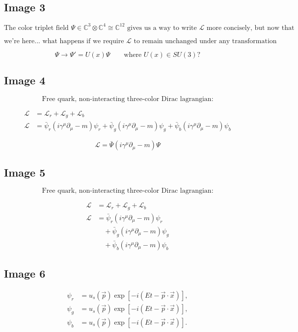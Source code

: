 \documentclass[11pt]{article}
\begin{document}
\subsection*{Image 3}
\[
\text{The color triplet field } \Psi \in \mathbb{C}^3 \otimes \mathbb{C}^4 \cong \mathbb{C}^{12}
\text{ gives us a way to write } \mathcal{L} \text{ more concisely, but now that}
\]

\[
\text{we're here... what happens if we require } \mathcal{L}
\text{ to remain unchanged under any transformation}
\]

\[
\Psi \to \Psi' = U(x)\Psi
\qquad
\text{where } U(x) \in SU(3)\text{?}
\]

\subsection*{Image 4}
\[
\text{Free quark, non-interacting three-color Dirac lagrangian:}
\]

\begin{align*}
\mathcal{L} &= \mathcal{L}_r + \mathcal{L}_g + \mathcal{L}_b \\
\mathcal{L}
&= \bar{\psi}_r \left(i\gamma^\mu \partial_\mu - m\right)\psi_r
 + \bar{\psi}_g \left(i\gamma^\mu \partial_\mu - m\right)\psi_g
 + \bar{\psi}_b \left(i\gamma^\mu \partial_\mu - m\right)\psi_b
\end{align*}

\[
\mathcal{L} = \bar{\Psi}\left(i\gamma^\mu \partial_\mu - m\right)\Psi
\]

\subsection*{Image 5}
\[
\text{Free quark, non-interacting three-color Dirac lagrangian:}
\]

\begin{align*}
\mathcal{L} &= \mathcal{L}_r + \mathcal{L}_g + \mathcal{L}_b \\
\mathcal{L}
&= \bar{\psi}_r \left(i\gamma^\mu \partial_\mu - m\right)\psi_r \\
&\quad + \bar{\psi}_g \left(i\gamma^\mu \partial_\mu - m\right)\psi_g \\
&\quad + \bar{\psi}_b \left(i\gamma^\mu \partial_\mu - m\right)\psi_b
\end{align*}

\subsection*{Image 6}
\begin{align*}
\psi_r &= u_s(\vec{p}) \exp\!\left[-i\left(Et - \vec{p}\cdot\vec{x}\right)\right], \\
\psi_g &= u_s(\vec{p}) \exp\!\left[-i\left(Et - \vec{p}\cdot\vec{x}\right)\right], \\
\psi_b &= u_s(\vec{p}) \exp\!\left[-i\left(Et - \vec{p}\cdot\vec{x}\right)\right].
\end{align*}
\end{document}
